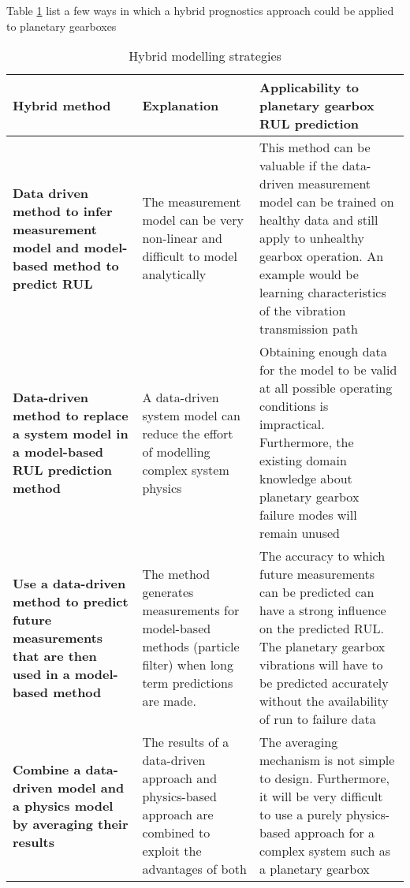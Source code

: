 Table \ref{t:Hybrid_Compare} list a few ways in which a hybrid prognostics approach could be applied to planetary gearboxes
\begin{table}[]
	\centering
	\caption{Hybrid modelling strategies}
	\label{t:Hybrid_Compare}
	\begin{tabular}{|p{4cm}|p{4cm}|p{7cm}|}
		\hline
		\textbf{Hybrid method }& \textbf{Explanation} & \textbf{Applicability to planetary gearbox RUL prediction} \\ \hline
		\textbf{Data driven method to infer measurement model and model-based method to predict RUL}& The measurement model can be very non-linear and difficult to model analytically & This method can be valuable if the data-driven measurement model can be trained on healthy data and still apply to unhealthy gearbox operation. An example would be learning characteristics of the vibration transmission path\\\hline
		\textbf{Data-driven method to replace a system model in a model-based RUL prediction method} & A data-driven system model can reduce the effort of modelling complex system physics & Obtaining enough data for the model to be valid at all possible operating conditions is impractical. Furthermore, the existing domain knowledge about planetary gearbox failure modes will remain unused\\\hline 
		\textbf{Use a data-driven method to predict future measurements that are then used in a model-based method    }        & The method generates measurements for model-based methods (particle filter) when long term predictions are made. &The accuracy to which future measurements can be predicted can have a strong influence on the predicted RUL. The planetary gearbox vibrations will have to be predicted accurately without the availability of run to failure data\\ \hline
		\textbf{ Combine a data-driven model and a physics model by averaging their results}& The results of a data-driven approach and physics-based approach are combined to exploit the advantages of both  & The averaging mechanism is not simple to design. Furthermore, it will be very difficult to use a purely physics-based approach for a complex system such as a planetary gearbox\\ \bottomrule
	\end{tabular}%
	
\end{table}




